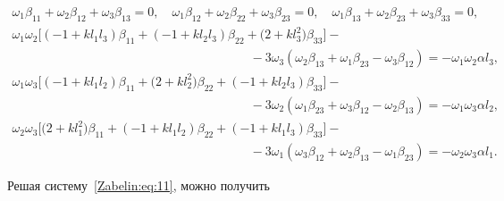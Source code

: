 \begin{equation}

\label{Zabelin:eq:11}

\begin{array}{l}

\omega_1\beta_{11}+\omega_2\beta_{12}+\omega_3\beta_{13}=0,\quad 

\omega_1\beta_{12}+\omega_2\beta_{22}+\omega_3\beta_{23}=0,\quad 

\omega_1\beta_{13}+\omega_2\beta_{23}+\omega_3\beta_{33}=0,\\

\omega_1\omega_2\big[(-1+kl_1l_3)\beta_{11}+(-1+kl_2l_3)\beta_{22}+\big(2+kl_3^2\big)\beta_{33}\big]-\\

\qquad \qquad \qquad \qquad \qquad \qquad \qquad \qquad \qquad \quad -

3\omega_3(\omega_2\beta_{13}+\omega_1\beta_{23}-\omega_3\beta_{12})=-\omega_1\omega_2\alpha

l_3,\\

\omega_1\omega_3\big[(-1+kl_1l_2)\beta_{11}+\big(2+kl_2^2\big)\beta_{22}+(-1+kl_2l_3)\beta_{33}\big]-

\\

\qquad \qquad \qquad \qquad \qquad \qquad \qquad \qquad \qquad \quad  -

3\omega_2(\omega_1\beta_{23}+\omega_3\beta_{12}-\omega_2\beta_{13})=-\omega_1\omega_3\alpha

l_2,\\

\omega_2\omega_3\big[\big(2+kl_1^2\big)\beta_{11}+(-1+kl_1l_2)\beta_{22}+(-1+kl_1l_3)\beta_{33}\big]-\\

\qquad \qquad \qquad \qquad \qquad\qquad \qquad \qquad \qquad \quad  -

3\omega_1(\omega_3\beta_{12}+\omega_2\beta_{13}-\omega_1\beta_{23})=-\omega_2\omega_3\alpha

l_1.

\end{array}

\end{equation}



Решая систему~\eqref{Zabelin:eq:11}, можно получить

